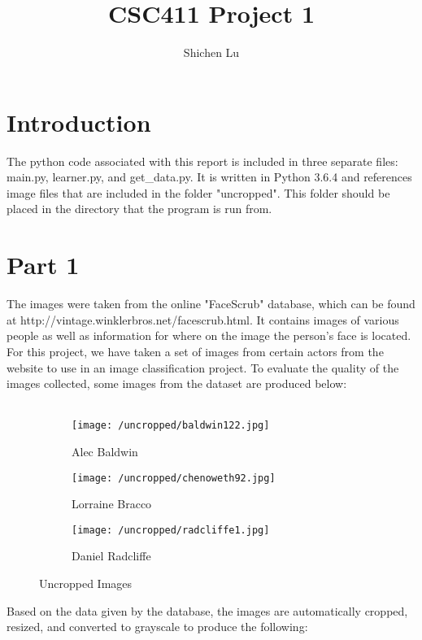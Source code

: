 \documentclass[11pt,a4paper]{report}
\author{Shichen Lu}
\title{CSC411 Project 1}
\begin{document}
\maketitle
\section*{Introduction}
The python code associated with this report is included in three separate files: main.py, learner.py, and get\_data.py. It is written in Python 3.6.4 and references image files that are included in the folder "uncropped". This folder should be placed in the directory that the program is run from.

\section*{Part 1}
The images were taken from the online "FaceScrub" database, which can be found at http://vintage.winklerbros.net/facescrub.html. It contains images of various 	people as well as information for where on the image the person's face is located. For this project, we have taken a set of images from certain actors from the website to use in an image classification project. To evaluate the quality of the images collected, some images from the dataset are produced below:\\\\


\begin{figure}[h]
\centering
\begin{subfigure}{.3\textwidth}
  \centering
  \texttt{[image: /uncropped/baldwin122.jpg]}
  \caption{Alec Baldwin}
  \label{fig:sub1}
\end{subfigure}%
\begin{subfigure}{.3\textwidth}
  \centering
  \texttt{[image: /uncropped/chenoweth92.jpg]}
  \caption{Lorraine Bracco}
  \label{fig:sub2}
\end{subfigure}
\begin{subfigure}{.3\textwidth}
  \centering
  \texttt{[image: /uncropped/radcliffe1.jpg]}
  \caption{Daniel Radcliffe}
  \label{fig:sub2}
\end{subfigure}
\caption{Uncropped Images}
\label{fig:test}
\end{figure}	

Based on the data given by the database, the images are automatically cropped, resized, and converted to grayscale to produce the following:
\end{document}
